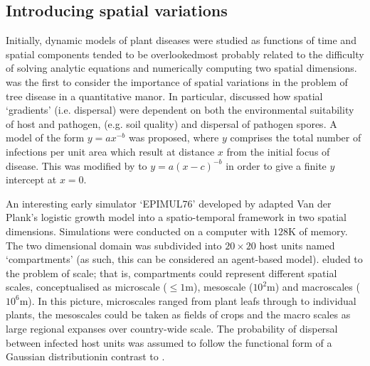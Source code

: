     \subsection{Introducing spatial variations}
    Initially, dynamic models of plant diseases were studied as functions of time and spatial components tended to be overlooked\textemdash most probably related to the difficulty of solving analytic equations and numerically computing two spatial dimensions. \cite{doi:10.1146/annurev.py.06.090168.001201} was the first to consider the importance of spatial variations in the problem of tree disease in a quantitative manor. In particular, \cite{doi:10.1146/annurev.py.06.090168.001201} discussed how spatial `gradients' (i.e. dispersal) were dependent on both the environmental suitability of host and pathogen, (e.g. soil quality) and dispersal of pathogen spores. A model of the form $y=ax^{-b}$ was proposed, where $y$ comprises the total number of infections per unit area which result at distance $x$ from the initial focus of disease. This was modified by \cite{mundt1985modification} to $y=a(x-c)^{-b}$ in order to give a finite $y$ intercept at $x=0$.
    
    An interesting early simulator `EPIMUL76' developed by \cite{zadoks1977role} adapted Van der Plank's logistic growth model into a spatio-temporal framework in two spatial dimensions. Simulations were conducted on a computer with $128\mathrm{K}$ of memory. The two dimensional domain was subdivided into $20\times 20$ host units named `compartments' (as such, this can be considered an agent-based model). \cite{zadoks1977role} eluded to the problem of scale; that is, compartments could represent different spatial scales, conceptualised as microscale ($\leq 1\mathrm{m}$), mesoscale ($10^2\mathrm{m}$) and macroscales ($10^6\mathrm{m}$). In this picture, microscales ranged from plant leafs through to individual plants, the mesoscales could be taken as fields of crops and the macro scales as large regional expanses over country-wide scale. The probability of dispersal between infected host units was assumed to follow the functional form of a Gaussian distribution\textemdash in contrast to \cite{doi:10.1146/annurev.py.06.090168.001201}.
    
